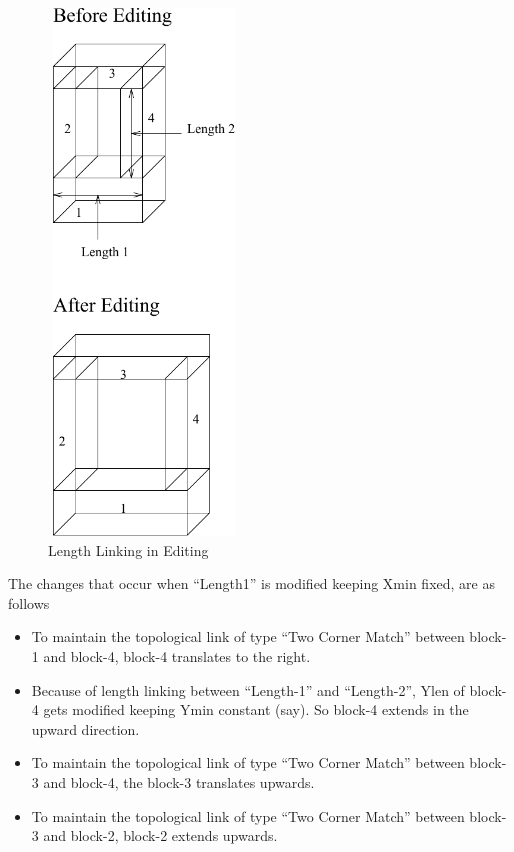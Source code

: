 \begin{itemize}
        \begin{figure}[htbp]
	\hspace{4cm}
	\includegraphics[width=2.0in,height=5.5in]{LENLINK.pdf}
            \caption{Length Linking in Editing}
            \label{lenlink}
        \end{figure}


	The changes that occur when ``Length1'' is modified keeping Xmin fixed,
	are as follows
		\begin{itemize}
		\item
		To maintain the topological link of type ``Two Corner Match'' between
		block-1 and block-4, block-4 translates to the right.
		\item
		Because of length linking between ``Length-1'' and ``Length-2'', Ylen
		of block-4 gets modified keeping Ymin constant (say). So block-4
		extends in the upward direction. 
		\item
		To maintain the topological link of type ``Two Corner Match'' between
        block-3 and block-4, the block-3 translates upwards.
		\item
        To maintain the topological link of type ``Two Corner Match'' between
        block-3 and block-2, block-2 extends upwards.
		\end{itemize}


\end{itemize}
